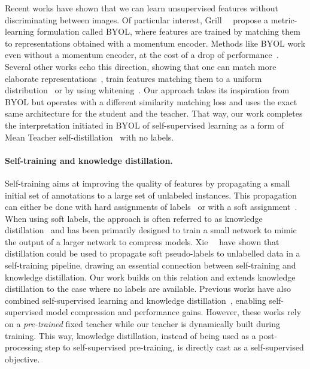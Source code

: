 Recent works have shown that we can learn unsupervised features without discriminating between images. Of particular interest, Grill~\etal~\cite{grill2020bootstrap} propose a metric-learning formulation called BYOL, where features are trained by matching them to representations obtained with a momentum encoder. Methods like BYOL work even without a momentum encoder, at the cost of a drop of performance~\cite{chen2020exploring,grill2020bootstrap}. Several other works echo this direction, showing that one can match more elaborate representations~\cite{gidaris2020learning,gidaris2020obow}, train features matching them to a uniform distribution~\cite{bojanowski2017unsupervised} or by using whitening~\cite{ermolov2020whitening,zbontar2021barlow}. Our approach takes its inspiration from BYOL but operates with a different similarity matching loss and uses the exact same architecture for the student and the teacher. That way, our work completes the interpretation initiated in BYOL of self-supervised learning as a form of Mean Teacher self-distillation~\cite{tarvainen2017mean} with no labels.

\paragraph{Self-training and knowledge distillation.} Self-training aims at improving the quality of features by propagating a small initial set of annotations to a large set of unlabeled instances. This propagation can either be done with hard assignments of labels~\cite{lee2013pseudo,xu2020iterative,yalniz2019billion} or with a soft assignment~\cite{xie2020self}. When using soft labels, the approach is often referred to as knowledge distillation~\cite{bucilua2006model,hinton2015distilling} and has been primarily designed to train a small network to mimic the output of a larger network to compress models.
Xie~\etal~\cite{xie2020self} have shown that distillation could be used to propagate soft pseudo-labels to unlabelled data in a self-training pipeline, drawing an essential connection between self-training and knowledge distillation. Our work builds on this relation and extends knowledge distillation to the case where no labels are available. Previous works have also combined self-supervised learning and knowledge distillation~\cite{fang2021seed,shen2021s2,chen2020big,noroozi2018boosting}, enabling self-supervised model compression and performance gains. However, these works rely on a \emph{pre-trained} fixed teacher while our teacher is dynamically built during training. This way, knowledge distillation, instead of being used as a post-processing step to self-supervised pre-training, is directly cast as a self-supervised objective.

